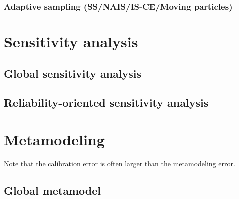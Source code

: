 \subsubsection{Adaptive sampling (SS/NAIS/IS-CE/Moving particles)}





\section{Sensitivity analysis}

\subsection{Global sensitivity analysis}

\subsection{Reliability-oriented sensitivity analysis}





\section{Metamodeling}
Note that the calibration error is often larger than the metamodeling error.

\subsection{Global metamodel}

